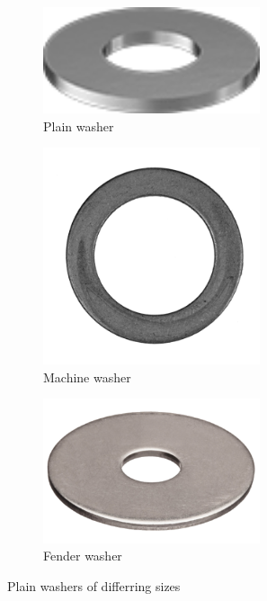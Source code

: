 \documentclass[10pt,letterpaper]{book}
\begin{document}
	\begin{figure}[H]
		\centering
		\begin{subfigure}[b]{.24\linewidth}
			\includegraphics[width=0.7\textwidth]{imgs/plainwasher.png}
			\caption{Plain washer}
		\end{subfigure}\begin{subfigure}[b]{.24\linewidth}
			\includegraphics[width=0.7\textwidth]{imgs/machinewasher.png}
			\caption{Machine washer}
		\end{subfigure}\begin{subfigure}[b]{.24\linewidth}
			\includegraphics[width=0.7\textwidth]{imgs/fenderwasher.png}
			\caption{Fender washer}
		\end{subfigure}
		\caption{Plain washers of differring sizes}
	\end{figure}
	
\end{document}
